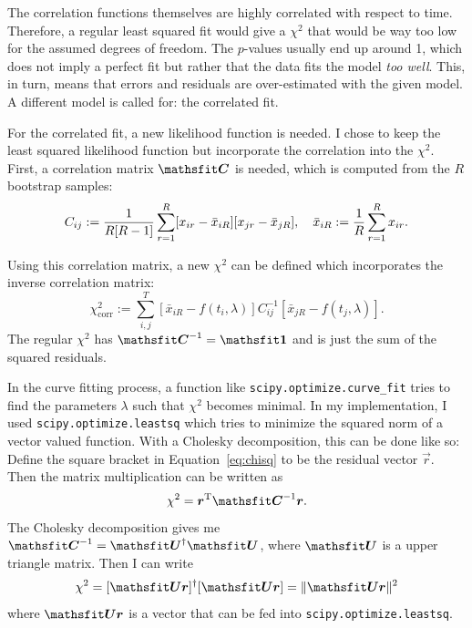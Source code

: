 \documentclass[11pt, english, fleqn, DIV=10, headinclude]{scrartcl}
\begin{document}
The correlation functions themselves are highly correlated with respect to
time. Therefore, a regular least squared fit would give a $\chi^2$ that would
be way too low for the assumed degrees of freedom. The $p$-values usually end
up around 1, which does not imply a perfect fit but rather that the data fits
the model \emph{too well}. This, in turn, means that errors and residuals are
over-estimated with the given model. A different model is called for: the
correlated fit.

For the correlated fit, a new likelihood function is needed. I chose to keep
the least squared likelihood function but incorporate the correlation into the
$\chi^2$. First, a correlation matrix $\tens C$ is needed, which is computed
from the $R$ bootstrap samples: \parencite[Section~2]{Michael:1994sz}
\begin{equation}
    \label{eq:correlation_matrix}
    C_{ij} := \frac{1}{R[R-1]} \sum_{r=1}^R
    [x_{ir} - \bar x_{iR}] [x_{jr} - \bar x_{jR}]
    ,\quad
    \bar x_{iR} := \frac 1R \sum_{r=1}^R x_{ir}.
\end{equation}

Using this correlation matrix, a new $\chi^2$ can be defined which incorporates
the inverse correlation matrix:
\begin{equation}
    \label{eq:chisq}
    \chi^2_\text{corr} := \sum_{i, j}^T
    \left[ \bar x_{iR} - f(t_i, \lambda) \right]
    C^{-1}_{ij}
    \left[ \bar x_{jR} - f(t_j, \lambda) \right].
\end{equation}
The regular $\chi^2$ has $\tens C^{-1} = \tens 1$ and is just the sum of the
squared residuals.

In the curve fitting process, a function like
\texttt{scipy.optimize.curve\_fit} tries to find the parameters $\lambda$ such
that $\chi^2$ becomes minimal. In my implementation, I used
\texttt{scipy.optimize.leastsq} which tries to minimize the squared norm of a
vector valued function. With a Cholesky decomposition, this can be done like
so: Define the square bracket in Equation~\eqref{eq:chisq} to be the residual
vector $\vec r$. Then the matrix multiplication can be written as
\begin{equation}
    \chi^2 = \vec r^\text T \tens C^{-1} \vec r.
\end{equation}
The Cholesky decomposition gives me $\tens C^{-1} = \tens U^\dagger \tens U$,
where $\tens U$ is a upper triangle matrix. Then I can write
\begin{equation}
    \chi^2 = [\tens U \vec r]^\dagger [\tens U \vec r]
    = \| \tens U \vec r \|^2
\end{equation}
where $\tens U \vec r$ is a vector that can be fed into
\texttt{scipy.optimize.leastsq}.
\end{document}
